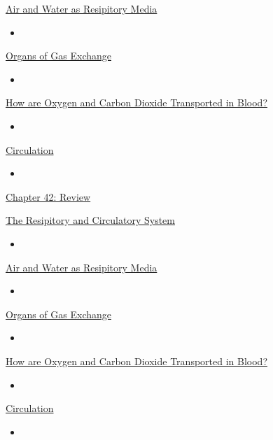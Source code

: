 \documentclass[12pt,letterpaper]{article}
\begin{document}
\hypertarget{42.2}{}
\begin{secbox}{\hyperlink{42}{Air and Water as Resipitory Media}}{
    \begin{itemize}
        \item
    \end{itemize}
}\end{secbox}

\hypertarget{42.3}{}
\begin{secbox}{\hyperlink{42}{Organs of Gas Exchange}}{
    \begin{itemize}
        \item
    \end{itemize}
}\end{secbox}

\hypertarget{42.4}{}
\begin{secbox}{\hyperlink{42}{How are Oxygen and Carbon Dioxide Transported in Blood?}}{
    \begin{itemize}
        \item
    \end{itemize}
}\end{secbox}

\hypertarget{42.5}{}
\begin{secbox}{\hyperlink{42}{Circulation}}{
    \begin{itemize}
        \item
    \end{itemize}
}\end{secbox}

\hypertarget{42.r}{}
\begin{probbox}{\hyperlink{42}{Chapter 42: Review}}\end{probbox}
    \hyperlink{42.1}{The Resipitory and Circulatory System}
    \begin{itemize}
        \item
    \end{itemize}
    \hyperlink{42.2}{Air and Water as Resipitory Media}
    \begin{itemize}
        \item      
    \end{itemize}
    \hyperlink{42.3}{Organs of Gas Exchange}
    \begin{itemize}
        \item
    \end{itemize}
    \hyperlink{42.4}{How are Oxygen and Carbon Dioxide Transported in Blood?}
    \begin{itemize}
        \item
    \end{itemize}
    \hyperlink{42.5}{Circulation}
    \begin{itemize}
        \item
    \end{itemize}
\end{document}
